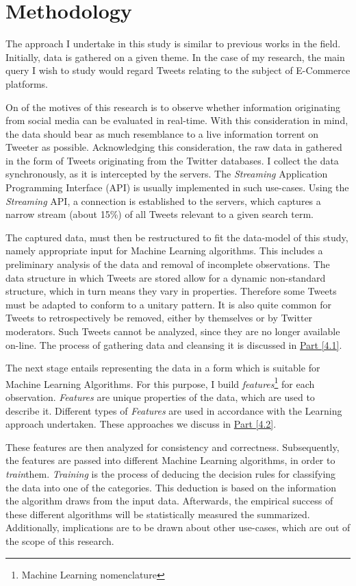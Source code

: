 \section{Methodology}
	The approach I undertake in this study is similar to previous works in the field. Initially, data is gathered on a given theme. In the case of my research, the main query I wish to study would regard Tweets relating to the subject of E-Commerce platforms.
	\par
	On of the motives of this research is to observe whether information originating from social media can be evaluated in real-time. With this consideration in mind, the data should bear as much resemblance to a live information torrent on Tweeter as possible. Acknowledging this consideration, the raw data in gathered in the form of Tweets originating from the Twitter databases. I collect the data synchronously, as it is intercepted by the servers. The \textit{Streaming} Application Programming Interface (API)\cite{stream_api} is usually implemented in such use-cases. Using the \textit{Streaming} API, a connection is established to the servers, which captures a narrow stream (about 15\%) of all Tweets relevant to a given search term. 
	\par
	The captured data, must then be restructured to fit the data-model of this study, namely appropriate input for Machine Learning algorithms. This includes a preliminary analysis of the data and removal of incomplete observations. The data structure in which Tweets are stored allow for a dynamic non-standard structure, which in turn means they vary in properties. Therefore some Tweets must be adapted to conform to a unitary pattern. It is also quite common for Tweets to retrospectively be removed, either by themselves or by Twitter moderators. Such Tweets cannot be analyzed, since they are no longer available on-line. The process of gathering data and cleansing it is discussed in \hyperref[sec:collect_data]{Part [4.1]}.
	\par
	The next stage entails representing the data in a form which is suitable for Machine Learning Algorithms. For this purpose, I build \textit{features}\footnote{\label{ml_note}Machine Learning nomenclature} for each observation. \textit{Features} are unique properties of the data, which are used to describe it. Different types of \textit{Features} are used in accordance with the Learning approach undertaken. These approaches  we discuss in \hyperref[build_features]{Part [4.2]}.
	\par
	These features are then analyzed for consistency and correctness. Subsequently, the features are passed into different Machine Learning algorithms, in order to \textit{train}\footnotemark[1] them. \textit{Training} is the process of deducing the decision rules for classifying the data into one of the categories. This deduction is based on the information the algorithm draws from the input data. Afterwards, the empirical success of these different algorithms will be statistically measured the summarized. Additionally, implications are to be drawn about other use-cases, which are out of the scope of this research. 
	

	
	